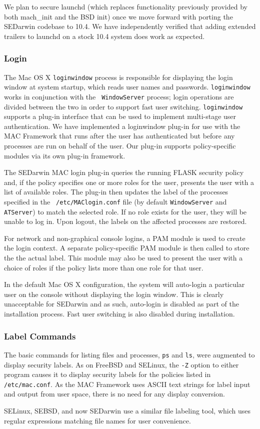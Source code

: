 We plan to secure launchd (which replaces functionality previously
provided by both mach\_init and the BSD init) once we move forward
with porting the SEDarwin codebase to 10.4.  We have independently
verified that adding extended trailers to launchd on a stock 10.4
system does work as expected.

\subsubsection{Login}
The Mac OS X {\tt loginwindow} process is responsible for displaying
the login window at system startup, which reads user names and
passwords.  {\tt loginwindow} works in conjunction with the {\tt
WindowServer} process; login operations are divided between the two
in order to support fast user switching.  {\tt loginwindow} supports
a plug-in interface that can be used to implement multi-stage user
authentication.  We have implemented a loginwindow plug-in for use
with the MAC Framework that runs after the user has authenticated
but before any processes are run on behalf of the user.  Our plug-in
supports policy-specific modules via its own plug-in framework.

The SEDarwin MAC login plug-in queries the running FLASK security
policy and, if the policy specifies one or more roles for the user,
presents the user with a list of available roles.  The plug-in then
updates the label of the processes specified in the {\tt
/etc/MAClogin.conf} file (by default {\tt WindowServer} and {\tt
ATServer}) to match the selected role.  If no role exists for the
user, they will be unable to log in.  Upon logout, the labels on
the affected processes are restored.

For network and non-graphical console logins, a PAM module is used
to create the login context.  A separate policy-specific PAM module
is then called to store the the actual label.  This module may also
be used to present the user with a choice of roles if the policy
lists more than one role for that user.

In the default Mac OS X configuration, the system will auto-login
a particular user on the console without displaying the login window.
This is clearly unacceptable for SEDarwin and as such, auto-login
is disabled as part of the installation process.  Fast user switching
is also disabled during installation.

\subsubsection{Label Commands}
The basic commands for listing files and processes, {\tt ps} and {\tt ls},
were augmented to display security labels. As on FreeBSD and SELinux, the {\tt -Z} option
to either program causes it to display security labels for the policies listed
in {\tt /etc/mac.conf}. As the MAC Framework uses ASCII text strings for
label input and output from user space, there is no need for any display
conversion.

SELinux, SEBSD, and now SEDarwin use a similar file labeling tool, which
uses regular expressions matching file names for user convenience. 
